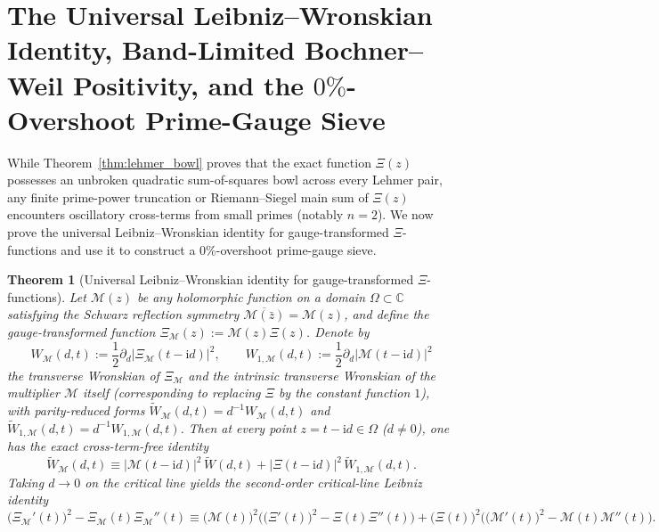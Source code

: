 \documentclass[11pt,reqno,a4paper]{amsart}
\theoremstyle{plain}
\newtheorem{theorem}{Theorem}[section]
\theoremstyle{definition}
\theoremstyle{remark}
\numberwithin{equation}{section}
\newcommand{\ii}{\mathrm{i}}
\begin{document}
\section{The Universal Leibniz--Wronskian Identity, Band-Limited Bochner--Weil Positivity, and the \texorpdfstring{$0\%$}{0\%}-Overshoot Prime-Gauge Sieve}\label{sec:leibniz_wronskian}

While Theorem~\ref{thm:lehmer_bowl} proves that the exact function $\Xi(z)$ possesses an unbroken quadratic sum-of-squares bowl across every Lehmer pair, any finite prime-power truncation or Riemann--Siegel main sum of $\Xi(z)$ encounters oscillatory cross-terms from small primes (notably $n=2$). We now prove the universal Leibniz--Wronskian identity for gauge-transformed $\Xi$-functions and use it to construct a $0\%$-overshoot prime-gauge sieve.

\begin{theorem}[Universal Leibniz--Wronskian identity for gauge-transformed $\Xi$-functions]\label{thm:leibniz_wronskian}
Let $\mathcal{M}(z)$ be any holomorphic function on a domain $\Omega \subset \mathbb{C}$ satisfying the Schwarz reflection symmetry $\overline{\mathcal{M}(\bar{z})} = \mathcal{M}(z)$, and define the gauge-transformed function $\Xi_{\mathcal{M}}(z) := \mathcal{M}(z)\Xi(z)$. Denote by
\begin{equation}\label{eq:W_M_defs}
  W_{\mathcal{M}}(d,t) := \frac{1}{2}\partial_d\big|\Xi_{\mathcal{M}}(t - \ii d)\big|^2, \qquad
  W_{1,\mathcal{M}}(d,t) := \frac{1}{2}\partial_d\big|\mathcal{M}(t - \ii d)\big|^2
\end{equation}
the transverse Wronskian of $\Xi_{\mathcal{M}}$ and the intrinsic transverse Wronskian of the multiplier $\mathcal{M}$ itself (corresponding to replacing $\Xi$ by the constant function $1$), with parity-reduced forms $\widetilde{W}_{\mathcal{M}}(d,t) = d^{-1}W_{\mathcal{M}}(d,t)$ and $\widetilde{W}_{1,\mathcal{M}}(d,t) = d^{-1}W_{1,\mathcal{M}}(d,t)$. Then at every point $z = t - \ii d \in \Omega$ ($d \neq 0$), one has the exact cross-term-free identity
\begin{equation}\label{eq:leibniz_wronskian_exact}
  \widetilde{W}_{\mathcal{M}}(d,t)
  \equiv \big|\mathcal{M}(t - \ii d)\big|^2\,\widetilde{W}(d,t)
  + \big|\Xi(t - \ii d)\big|^2\,\widetilde{W}_{1,\mathcal{M}}(d,t).
\end{equation}
Taking $d \to 0$ on the critical line yields the second-order critical-line Leibniz identity
\begin{equation}\label{eq:leibniz_wronskian_d0}
  \big(\Xi_{\mathcal{M}}'(t)\big)^2 - \Xi_{\mathcal{M}}(t)\Xi_{\mathcal{M}}''(t)
  \equiv \big(\mathcal{M}(t)\big)^2\Big(\big(\Xi'(t)\big)^2 - \Xi(t)\Xi''(t)\Big)
  + \big(\Xi(t)\big)^2\Big(\big(\mathcal{M}'(t)\big)^2 - \mathcal{M}(t)\mathcal{M}''(t)\Big).
\end{equation}
\end{theorem}
\end{document}
